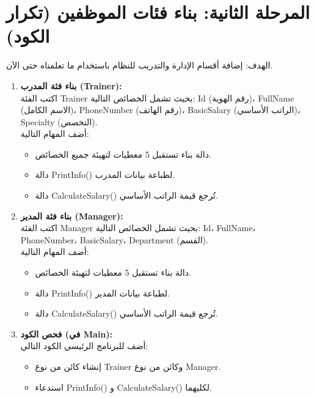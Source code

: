 \documentclass[14pt]{extarticle}
\begin{document}
\clearpage
\section*{المرحلة الثانية: بناء فئات الموظفين (تكرار الكود)}
الهدف: إضافة أقسام الإدارة والتدريب للنظام باستخدام ما تعلمناه حتى الآن.

\begin{enumerate}[itemsep=3em]
    \item
    \textbf{بناء فئة المدرب (\textenglish{Trainer}):} \\
    اكتب الفئة \textenglish{Trainer} بحيث تشمل الخصائص التالية:
    \textenglish{Id} (رقم الهوية)، \textenglish{FullName} (الاسم الكامل)، \textenglish{PhoneNumber} (رقم الهاتف)، \textenglish{BasicSalary} (الراتب الأساسي)، \textenglish{Specialty} (التخصص). \\
    أضف المهام التالية:
    \begin{itemize}
        \item دالة بناء تستقبل 5 معطيات لتهيئة جميع الخصائص.
        \item دالة \textenglish{PrintInfo()} لطباعة بيانات المدرب.
        \item دالة \textenglish{CalculateSalary()} تُرجع قيمة الراتب الأساسي.
    \end{itemize}

    \item
    \textbf{بناء فئة المدير (\textenglish{Manager}):} \\
    اكتب الفئة \textenglish{Manager} بحيث تشمل الخصائص التالية:
    \textenglish{Id}، \textenglish{FullName}، \textenglish{PhoneNumber}، \textenglish{BasicSalary}، \textenglish{Department} (القسم). \\
    أضف المهام التالية:
    \begin{itemize}
        \item دالة بناء تستقبل 5 معطيات لتهيئة الخصائص.
        \item دالة \textenglish{PrintInfo()} لطباعة بيانات المدير.
        \item دالة \textenglish{CalculateSalary()} تُرجع قيمة الراتب الأساسي.
    \end{itemize}

    \item
    \textbf{فحص الكود (في \textenglish{Main}):} \\
    أضف للبرنامج الرئيسي الكود التالي:
    \begin{itemize}
        \item إنشاء كائن من نوع \textenglish{Trainer} وكائن من نوع \textenglish{Manager}.
        \item استدعاء \textenglish{PrintInfo()} و \textenglish{CalculateSalary()} لكليهما.
    \end{itemize}
\end{enumerate}
\end{document}
